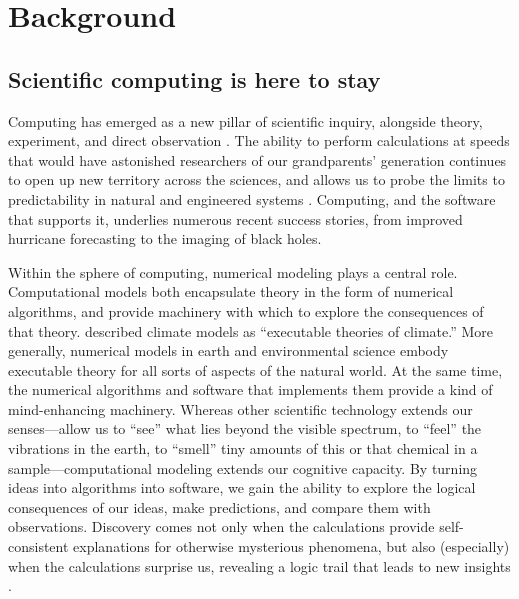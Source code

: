 \documentclass[12pt]{amsart}
\begin{document}
\section{Background}
\label{sec:background}

\subsection{Scientific computing is here to stay}

Computing has emerged as a new pillar of scientific inquiry, alongside theory, experiment, and direct observation  \citep{pitac2005computational}. The ability to perform calculations at speeds that would have astonished researchers of our grandparents' generation continues to open up new territory across the sciences, and allows us to probe the limits to predictability in natural and engineered systems \citep{post2005computational,post2013changing}. Computing, and the software that supports it, underlies numerous recent success stories, from improved hurricane forecasting to the imaging of black holes. 

Within the sphere of computing, numerical modeling plays a central role. Computational models both encapsulate theory in the form of numerical algorithms, and provide machinery with which to explore the consequences of that theory. \citet{pipitone2012assessing} described climate models as ``executable theories of climate.'' More generally, numerical models in earth and environmental science embody executable theory for all sorts of aspects of the natural world. At the same time, the numerical algorithms and software that implements them provide a kind of mind-enhancing machinery. Whereas other scientific technology extends our senses---allow us to ``see'' what lies beyond the visible spectrum, to ``feel'' the vibrations in the earth, to ``smell'' tiny amounts of this or that chemical in a sample---computational modeling extends our cognitive capacity. By turning ideas into algorithms into software, we gain the ability to explore the logical consequences of our ideas, make predictions, and compare them with observations. Discovery comes not only when the calculations provide self-consistent explanations for otherwise mysterious phenomena, but also (especially) when the calculations surprise us, revealing a logic trail that leads to new insights \citep{bras2003six}.

\end{document}
